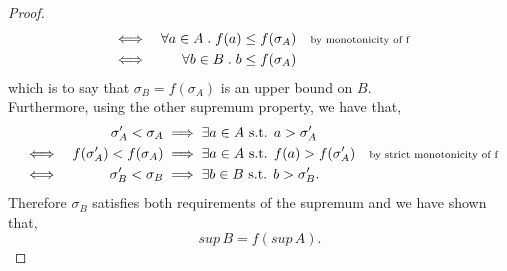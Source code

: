 \documentclass[MathsNotesBase.tex]{subfiles}
\begin{document}
{\begin{proof}
\begin{align*}
			&\iff & \forall a \in A \;.\; f(a)  &\leq f(\sigma_A)  &\text{\scriptsize{by monotonicity of f}}\\
			&\iff & \forall b \in B \;.\; b  &\leq f(\sigma_A) 
			\end{align*}
			which is to say that $\sigma_B = f(\sigma_A)$ is an upper bound on $B$.\\
			Furthermore, using the other supremum property, we have that,
			\begin{align*}
			&& \sigma_A' < \sigma_A &\implies \exists a \in A \text{ s.t. } a > \sigma_A' \\
			&\iff & f(\sigma_A') < f(\sigma_A)  &\implies \exists a \in A \text{ s.t. } f(a) > f(\sigma_A')  &\text{\scriptsize{by strict monotonicity of f}}\\
			&\iff & \sigma_B' < \sigma_B  &\implies \exists b \in B \text{ s.t. } b > \sigma_B'.	
			\end{align*}
			Therefore $\sigma_B$ satisfies both requirements of the supremum and we have shown that,
			\[ sup \, B = f(sup \, A). \]
		\end{proof}
	}
	
	
	\pagebreak
	
\end{document}
